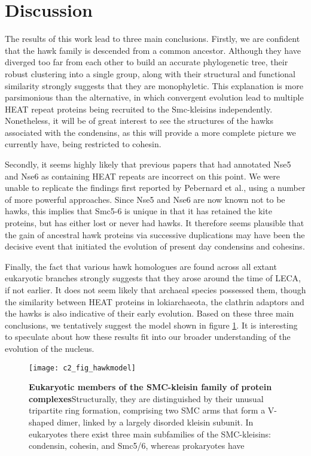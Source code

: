 \documentclass[a4paper,11pt,twoside,openright]{scrbook}
\begin{document}
\clearpage

\section{Discussion}

The results of this work lead to three main conclusions. Firstly, we are confident that the hawk family is descended from a common ancestor. Although they have diverged too far from each other to build an accurate phylogenetic tree, their robust clustering into a single group, along with their structural and functional similarity strongly suggests that they are monophyletic. This explanation is more parsimonious than the alternative, in which convergent evolution lead to multiple HEAT repeat proteins being recruited to the Smc-kleisins independently. Nonetheless, it will be of great interest to see the structures of the hawks associated with the condensins, as this will provide a more complete picture we currently have, being restricted to cohesin.

Secondly, it seems highly likely that previous papers that had annotated Nse5 and Nse6 as containing HEAT repeats are incorrect on this point. We were unable to replicate the findings first reported by Pebernard et al., using a number of more powerful approaches. Since Nse5 and Nse6 are now known not to be hawks, this implies that Smc5-6 is unique in that it has retained the kite proteins, but has either lost or never had hawks. It therefore seems plausible that the gain of ancestral hawk proteins via successive duplications may have been the decisive event that initiated the evolution of present day condensins and cohesins.

Finally, the fact that various hawk homologues are found across all extant eukaryotic branches strongly suggests that they arose around the time of LECA, if not earlier. It does not seem likely that archaeal species possessed them, though the similarity between HEAT proteins in lokiarchaeota, the clathrin adaptors and the hawks is also indicative of their early evolution. Based on these three main conclusions, we tentatively suggest the model shown in figure \ref{figure:hawkmodel}. It is interesting to speculate about how these results fit into our broader understanding of the evolution of the nucleus.

\begin{figure}[h]
\fcapsideright
    {\caption[Eukaryotic members of the SMC-kleisin family of protein complexes]{\sffamily\textbf{Eukaryotic members of the SMC-kleisin family of protein complexes}\newline \small Structurally, they are distinguished by their unusual tripartite ring formation, comprising two SMC arms that form a V-shaped dimer, linked by a largely disorded kleisin subunit. In eukaryotes there exist three main subfamilies of the SMC-kleisins: condensin, cohesin, and Smc5/6, whereas prokaryotes have }\label{figure:hawkmodel}}
    {\texttt{[image: c2\_fig\_hawkmodel]}}
\end{figure}

\end{document}
